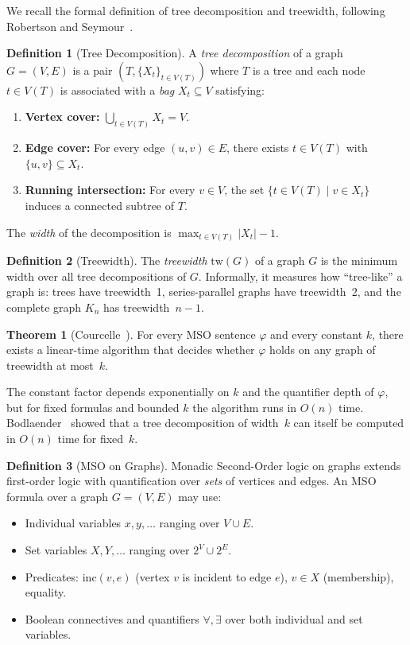 \documentclass[11pt,a4paper]{article}
\theoremstyle{definition}
\newtheorem{definition}{Definition}[section]
\newtheorem{theorem}{Theorem}[section]
\theoremstyle{remark}
\newcommand{\tw}{\ensuremath{\mathrm{tw}}}
\begin{document}
We recall the formal definition of tree decomposition and treewidth,
following Robertson and Seymour~\cite{robertson1986}.

\begin{definition}[Tree Decomposition]
\label{def:tree-decomp}
A \emph{tree decomposition} of a graph $G = (V, E)$ is a pair
$(T, \{X_t\}_{t \in V(T)})$ where $T$ is a tree and each node
$t \in V(T)$ is associated with a \emph{bag} $X_t \subseteq V$
satisfying:
\begin{enumerate}[label=(\roman*)]
\item \textbf{Vertex cover:} $\bigcup_{t \in V(T)} X_t = V$.
\item \textbf{Edge cover:} For every edge $(u, v) \in E$, there
  exists $t \in V(T)$ with $\{u, v\} \subseteq X_t$.
\item \textbf{Running intersection:} For every $v \in V$, the set
  $\{t \in V(T) \mid v \in X_t\}$ induces a connected subtree of $T$.
\end{enumerate}
The \emph{width} of the decomposition is $\max_{t \in V(T)} |X_t| - 1$.
\end{definition}

\begin{definition}[Treewidth]
\label{def:treewidth}
The \emph{treewidth} $\tw(G)$ of a graph $G$ is the minimum width
over all tree decompositions of $G$. Informally, it measures how
``tree-like'' a graph is: trees have treewidth~1, series-parallel
graphs have treewidth~2, and the complete graph $K_n$ has
treewidth~$n - 1$.
\end{definition}

\begin{theorem}[Courcelle~\cite{courcelle1990}]
\label{thm:courcelle}
For every MSO sentence $\varphi$ and every constant $k$, there exists
a linear-time algorithm that decides whether $\varphi$ holds on any
graph of treewidth at most~$k$.
\end{theorem}

The constant factor depends exponentially on $k$ and the quantifier
depth of $\varphi$, but for fixed formulas and bounded $k$ the
algorithm runs in $O(n)$ time. Bodlaender~\cite{bodlaender1998}
showed that a tree decomposition of width~$k$ can itself be computed
in $O(n)$ time for fixed~$k$.

\begin{definition}[MSO on Graphs]
\label{def:mso}
Monadic Second-Order logic on graphs extends first-order logic with
quantification over \emph{sets} of vertices and edges. An MSO formula
over a graph $G = (V, E)$ may use:
\begin{itemize}[leftmargin=1.4em]
\item Individual variables $x, y, \ldots$ ranging over $V \cup E$.
\item Set variables $X, Y, \ldots$ ranging over $2^V \cup 2^E$.
\item Predicates: $\mathrm{inc}(v, e)$ (vertex $v$ is incident to
  edge $e$), $v \in X$ (membership), equality.
\item Boolean connectives and quantifiers $\forall, \exists$ over
  both individual and set variables.
\end{itemize}
\end{definition}
\end{document}
